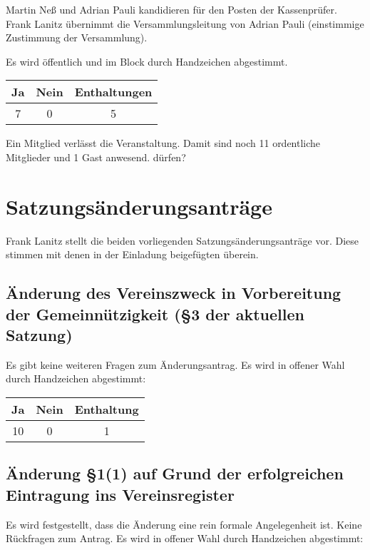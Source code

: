 \documentclass{scrartcl}
\begin{document}
Martin Neß und Adrian Pauli kandidieren für den Posten der Kassenprüfer.
Frank Lanitz übernimmt die Versammlungsleitung von Adrian Pauli
(einstimmige Zustimmung der Versammlung).

Es wird öffentlich und im Block durch Handzeichen abgestimmt.

\begin{table}[h!]
    \centering
    \begin{tabular}{c|c|c}
        \textbf{Ja}& \textbf{Nein} & \textbf{Enthaltungen} \\ \hline
        7 & 0 & 5
    \end{tabular}
\end{table}

Ein Mitglied verlässt die Veranstaltung. Damit sind noch 11 ordentliche
Mitglieder und 1 Gast anwesend.
dürfen?

\section{Satzungsänderungsanträge}
Frank Lanitz stellt die beiden vorliegenden Satzungsänderungsanträge
vor. Diese stimmen mit denen in der Einladung beigefügten überein.

\subsection{Änderung des Vereinszweck in Vorbereitung der
Gemeinnützigkeit (§3 der aktuellen Satzung)}

Es gibt keine weiteren Fragen zum Änderungsantrag. Es wird in offener
Wahl durch Handzeichen abgestimmt:

\begin{table}[h!]
    \centering
    \begin{tabular}{c|c|c}
        \textbf{Ja} & \textbf{Nein} & \textbf{Enthaltung} \\ \hline
        10 & 0 & 1
    \end{tabular}
\end{table}

\subsection{Änderung §1(1) auf Grund der erfolgreichen Eintragung ins
Vereinsregister}

Es wird festgestellt, dass die Änderung eine rein formale Angelegenheit
ist. Keine Rückfragen zum Antrag. Es wird in offener Wahl durch
Handzeichen abgestimmt:
\end{document}
